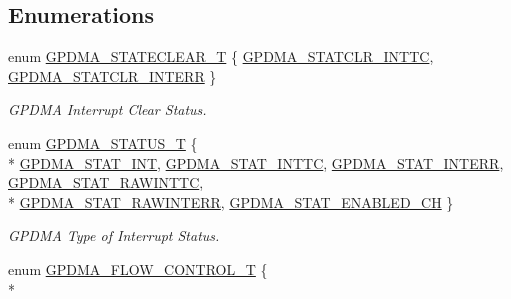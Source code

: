 \subsection*{Enumerations}
\begin{DoxyCompactItemize}
\item 
enum \hyperlink{group__GPDMA__17XX__40XX_gabbb281ef4b818f2e60167cf766f94fdb}{G\-P\-D\-M\-A\-\_\-\-S\-T\-A\-T\-E\-C\-L\-E\-A\-R\-\_\-\-T} \{ \hyperlink{group__GPDMA__17XX__40XX_ggabbb281ef4b818f2e60167cf766f94fdba9a0c8256eb0f656d56f065914219c96c}{G\-P\-D\-M\-A\-\_\-\-S\-T\-A\-T\-C\-L\-R\-\_\-\-I\-N\-T\-T\-C}, 
\hyperlink{group__GPDMA__17XX__40XX_ggabbb281ef4b818f2e60167cf766f94fdbaf6e975b9dfa7d659d18a377c7873b92a}{G\-P\-D\-M\-A\-\_\-\-S\-T\-A\-T\-C\-L\-R\-\_\-\-I\-N\-T\-E\-R\-R}
 \}
\begin{DoxyCompactList}\small\item\em G\-P\-D\-M\-A Interrupt Clear Status. \end{DoxyCompactList}\item 
enum \hyperlink{group__GPDMA__17XX__40XX_ga2f4aa97bd0ffa5046c8e2b17028d99cc}{G\-P\-D\-M\-A\-\_\-\-S\-T\-A\-T\-U\-S\-\_\-\-T} \{ \\*
\hyperlink{group__GPDMA__17XX__40XX_gga2f4aa97bd0ffa5046c8e2b17028d99ccaf89b610470a940617af6bef4f4451aa9}{G\-P\-D\-M\-A\-\_\-\-S\-T\-A\-T\-\_\-\-I\-N\-T}, 
\hyperlink{group__GPDMA__17XX__40XX_gga2f4aa97bd0ffa5046c8e2b17028d99ccac093908914ed40148e81169fc15df2f7}{G\-P\-D\-M\-A\-\_\-\-S\-T\-A\-T\-\_\-\-I\-N\-T\-T\-C}, 
\hyperlink{group__GPDMA__17XX__40XX_gga2f4aa97bd0ffa5046c8e2b17028d99ccaee7927c433e007f270c365bcca865706}{G\-P\-D\-M\-A\-\_\-\-S\-T\-A\-T\-\_\-\-I\-N\-T\-E\-R\-R}, 
\hyperlink{group__GPDMA__17XX__40XX_gga2f4aa97bd0ffa5046c8e2b17028d99cca4a74b1bc907fbbdbf9dfb05222f0b513}{G\-P\-D\-M\-A\-\_\-\-S\-T\-A\-T\-\_\-\-R\-A\-W\-I\-N\-T\-T\-C}, 
\\*
\hyperlink{group__GPDMA__17XX__40XX_gga2f4aa97bd0ffa5046c8e2b17028d99ccad547775dc5510034932bf1597931e899}{G\-P\-D\-M\-A\-\_\-\-S\-T\-A\-T\-\_\-\-R\-A\-W\-I\-N\-T\-E\-R\-R}, 
\hyperlink{group__GPDMA__17XX__40XX_gga2f4aa97bd0ffa5046c8e2b17028d99cca711d88f645a203338f297a286b912767}{G\-P\-D\-M\-A\-\_\-\-S\-T\-A\-T\-\_\-\-E\-N\-A\-B\-L\-E\-D\-\_\-\-C\-H}
 \}
\begin{DoxyCompactList}\small\item\em G\-P\-D\-M\-A Type of Interrupt Status. \end{DoxyCompactList}\item 
enum \hyperlink{group__GPDMA__17XX__40XX_ga2cb59b641cd840f22780c44be1208133}{G\-P\-D\-M\-A\-\_\-\-F\-L\-O\-W\-\_\-\-C\-O\-N\-T\-R\-O\-L\-\_\-\-T} \{ \\*

\end{DoxyCompactItemize}

